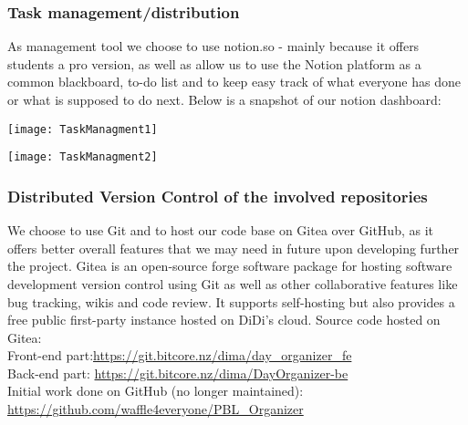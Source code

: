 \subsubsection{Task management/distribution}
\par As management tool we choose to use notion.so - mainly because it offers students a pro version, as well as allow us to use the Notion platform as a common blackboard, to-do list and to keep easy track of what everyone has done or what is supposed to do next.
Below is a snapshot of our notion dashboard:
\par
\texttt{[image: TaskManagment1]}
\par
\texttt{[image: TaskManagment2]}
\subsubsection{Distributed Version Control of the involved repositories}
\par We choose to use Git and to host our code base on Gitea over GitHub, as it offers better overall features that we may need in future upon developing further the project. 
Gitea is an open-source forge software package for hosting software development version control using Git as well as other collaborative features like bug tracking, wikis and code review. It supports self-hosting but also provides a free public first-party instance hosted on DiDi's cloud.
Source code hosted on Gitea:\\
 Front-end part:\url{https://git.bitcore.nz/dima/day_organizer_fe}\\
 Back-end part: \url{https://git.bitcore.nz/dima/DayOrganizer-be}\\
 Initial work done on GitHub (no longer maintained):\url{ https://github.com/waffle4everyone/PBL_Organizer	}


\clearpage